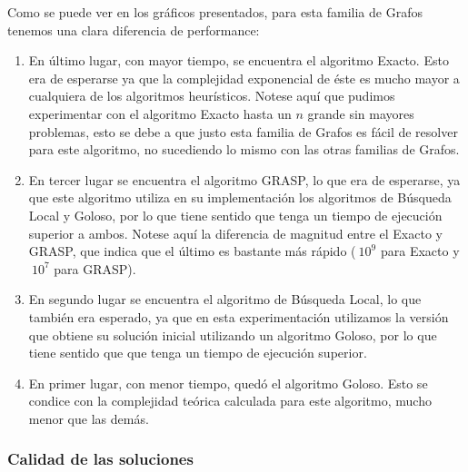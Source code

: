 Como se puede ver en los gráficos presentados, para esta familia de Grafos tenemos una clara diferencia de performance:
\begin{enumerate}
    \item En último lugar, con mayor tiempo, se encuentra el algoritmo Exacto. Esto era de esperarse ya que la complejidad exponencial de éste es mucho mayor a cualquiera de los algoritmos heurísticos. Notese aquí que pudimos experimentar con el algoritmo Exacto hasta un $n$ grande sin mayores problemas, esto se debe a que justo esta familia de Grafos es fácil de resolver para este algoritmo, no sucediendo lo mismo con las otras familias de Grafos.
    \item En tercer lugar se encuentra el algoritmo GRASP, lo que era de esperarse, ya que este algoritmo utiliza en su implementación los algoritmos de Búsqueda Local y Goloso, por lo que tiene sentido que tenga un tiempo de ejecución superior a ambos. Notese aquí la diferencia de magnitud entre el Exacto y GRASP, que indica que el último es bastante más rápido ($~10^9$ para Exacto y $~10^7$ para GRASP).
    \item En segundo lugar se encuentra el algoritmo de Búsqueda Local, lo que también era esperado, ya que en esta experimentación utilizamos la versión que obtiene su solución inicial utilizando un algoritmo Goloso, por lo que tiene sentido que que tenga un tiempo de ejecución superior.
    \item En primer lugar, con menor tiempo, quedó el algoritmo Goloso. Esto se condice con la complejidad teórica calculada para este algoritmo, mucho menor que las demás.
\end{enumerate}

\subsubsection{Calidad de las soluciones}
\begin{center}
\end{center}

